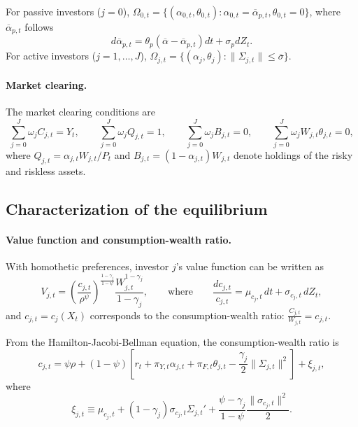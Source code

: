 \documentclass[11pt,english]{article}
\begin{document}
For passive investors ($j=0$),  
$\Omega_{0,t} = \{(\alpha_{0,t}, \theta_{0,t}): \alpha_{0,t} = \overline{\alpha}_{p,t}, \theta_{0,t} = 0\}$, where $\overline{\alpha}_{p,t}$ follows 
\begin{equation}
    d \overline{\alpha}_{p,t} = \theta_p (\overline{\alpha} - \overline{\alpha}_{p,t}) dt + \sigma_{p}  d Z_t.
\end{equation}	
For active investors ($j=1,\ldots,J$),  
$\Omega_{j,t} = \{(\alpha_j, \theta_j): \| \Sigma_{j,t} \| \leq \overline{\sigma}\}$. 

\paragraph{Market clearing.} The  market clearing conditions are
\begin{equation}
	\sum_{j=0}^J \omega_j C_{j,t} = Y_t, 
	\qquad 
	\sum_{j=0}^J \omega_j Q_{j,t} = 1, 
	\qquad 
	\sum_{j=0}^J \omega_j B_{j,t} = 0,
	\qquad
	\sum_{j=0}^J \omega_j W_{j,t} \theta_{j,t} = 0,
\end{equation}
where $Q_{j,t} = \alpha_{j,t} W_{j,t} / P_t$ and $B_{j,t} = (1-\alpha_{j,t}) W_{j,t}$ denote holdings of the risky and riskless assets. 

\subsection{Characterization of the equilibrium}

\paragraph{Value function and consumption-wealth ratio.} With homothetic preferences, investor $j$'s value function can be written as
\begin{equation}\nonumber
    V_{j,t} = \left( \frac{c_{j,t}}{\rho^\psi} \right)^{\frac{1-\gamma_j}{1-\psi}} 
    \frac{W_{j,t}^{1-\gamma_j}}{1-\gamma_j}, \qquad \text{where} \qquad \frac{dc_{j,t}}{c_{j,t}} = \mu_{c_j,t}\, dt + \sigma_{c_j,t}\, dZ_t,
\end{equation}
and $c_{j,t} = c_j(X_t)$ corresponds to the consumption-wealth ratio: $\frac{C_{j,t}}{W_{j,t}} = c_{j,t}$.

From the Hamilton-Jacobi-Bellman equation, the consumption-wealth ratio is
\begin{equation}\label{eq:HJB_complete}
    c_{j,t} = \psi \rho 
    + (1-\psi) \left[ r_t + \pi_{Y,t} \alpha_{j,t} + \pi_{F,t} \theta_{j,t}
        - \frac{\gamma_j}{2} \|\Sigma_{j,t}\|^2 \right] 
    + \xi_{j,t},
\end{equation}
where 
\[
    \xi_{j,t} \equiv \mu_{c_j,t} 
    + (1-\gamma_j) \sigma_{c_j,t} \Sigma_{j,t}' 
    + \frac{\psi - \gamma_j}{1-\psi} \frac{\|\sigma_{c_j,t}\|^2}{2}.
\]
\end{document}

